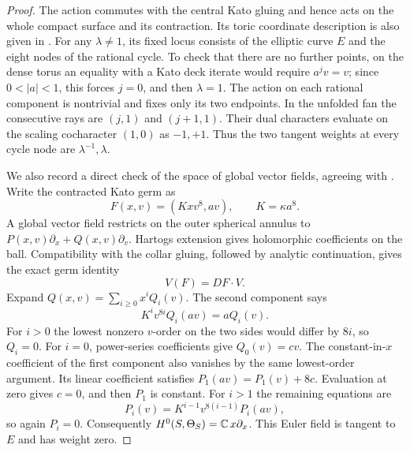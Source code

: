 \begin{proof}
The action commutes with the central Kato gluing and hence
acts on the whole compact surface and its contraction.
Its toric coordinate description is also given in
\citet[Section~2, equations~(1)--(8)]{Fujiki2009D}.
For any $\lambda\ne1$, its fixed locus consists of the elliptic
curve $E$ and the eight nodes of the rational cycle.
To check that there are no further points, on the dense torus
an equality with a Kato deck iterate would require $a^jv=v$;
since $0<|a|<1$, this forces $j=0$, and then $\lambda=1$.
The action on each rational component is nontrivial and fixes
only its two endpoints.  In the unfolded fan the consecutive
rays are $(j,1)$ and $(j+1,1)$.
Their dual characters evaluate on the scaling cocharacter
$(1,0)$ as $-1,+1$.
Thus the two tangent weights at every cycle node are
$\lambda^{-1},\lambda$.

We also record a direct check of the space of global vector
fields, agreeing with \citet[Theorem~1.1]{Fujiki2009D}.
Write the contracted Kato germ as
\[
 F(x,v)=(Kxv^8,av),\qquad K=\kappa a^8.
\]
A global vector field restricts on the outer spherical annulus
to $P(x,v)\partial_x+Q(x,v)\partial_v$.
Hartogs extension gives holomorphic coefficients on the ball.
Compatibility with the collar gluing, followed by analytic
continuation, gives the exact germ identity
\[
 V(F)=DF\cdot V.
\]
Expand $Q(x,v)=\sum_{i\ge0}x^iQ_i(v)$.
The second component says
\[
 K^iv^{8i}Q_i(av)=aQ_i(v).
\]
For $i>0$ the lowest nonzero $v$-order on the two sides would
differ by $8i$, so $Q_i=0$.
For $i=0$, power-series coefficients give $Q_0(v)=cv$.
The constant-in-$x$ coefficient of the first component also
vanishes by the same lowest-order argument.
Its linear coefficient satisfies
$P_1(av)=P_1(v)+8c$.
Evaluation at zero gives $c=0$, and then $P_1$ is constant.
For $i>1$ the remaining equations are
\[
 P_i(v)=K^{i-1}v^{8(i-1)}P_i(av),
\]
so again $P_i=0$.
Consequently $H^0(S,\Theta_S)=\mathbb C\,x\partial_x$.
This Euler field is tangent to $E$ and has weight zero.


\end{proof}
